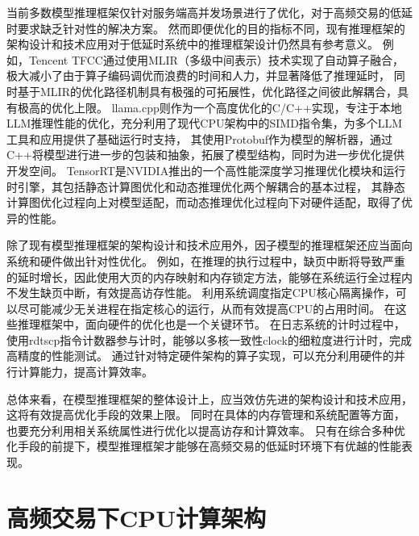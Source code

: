 当前多数模型推理框架仅针对服务端高并发场景进行了优化，对于高频交易的低延时要求缺乏针对性的解决方案。
然而即便优化的目的指标不同，现有推理框架的架构设计和技术应用对于低延时系统中的推理框架设计仍然具有参考意义。
例如，Tencent TFCC通过使用MLIR（多级中间表示）技术实现了自动算子融合，极大减小了由于算子编码调优而浪费的时间和人力，并显著降低了推理延时，
同时基于MLIR的优化路径机制具有极强的可拓展性，优化路径之间彼此解耦合，具有极高的优化上限。
llama.cpp则作为一个高度优化的C/C++实现，专注于本地LLM推理性能的优化，充分利用了现代CPU架构中的SIMD指令集，为多个LLM工具和应用提供了基础运行时支持，
其使用Protobuf作为模型的解析器，通过C++将模型进行进一步的包装和抽象，拓展了模型结构，同时为进一步优化提供开发空间。
TensorRT是NVIDIA推出的一个高性能深度学习推理优化模块和运行时引擎，其包括静态计算图优化和动态推理优化两个解耦合的基本过程，
其静态计算图优化过程向上对模型适配，而动态推理优化过程向下对硬件适配，取得了优异的性能。

除了现有模型推理框架的架构设计和技术应用外，因子模型的推理框架还应当面向系统和硬件做出针对性优化。
例如，在推理的执行过程中，缺页中断将导致严重的延时增长，因此使用大页的内存映射和内存锁定方法，能够在系统运行全过程内不发生缺页中断，有效提高访存性能。
利用系统调度指定CPU核心隔离操作，可以尽可能减少无关进程在指定核心的运行，从而有效提高CPU的占用时间。
在这些推理框架中，面向硬件的优化也是一个关键环节。
在日志系统的计时过程中，使用rdtscp指令计数器参与计时，能够以多核一致性clock的细粒度进行计时，完成高精度的性能测试。
通过针对特定硬件架构的算子实现，可以充分利用硬件的并行计算能力，提高计算效率。

总体来看，在模型推理框架的整体设计上，应当效仿先进的架构设计和技术应用，这将有效提高优化手段的效果上限。
同时在具体的内存管理和系统配置等方面，也要充分利用相关系统属性进行优化以提高访存和计算效率。
只有在综合多种优化手段的前提下，模型推理框架才能够在高频交易的低延时环境下有优越的性能表现。

\section{高频交易下CPU计算架构}

